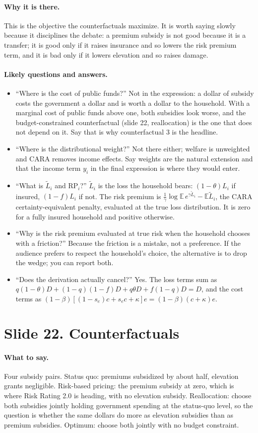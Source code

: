 \documentclass[11pt]{article}
\newcommand{\slide}[2]{\section*{Slide #1. #2}\addcontentsline{toc}{section}{Slide #1. #2}}
\newcommand{\say}{\paragraph{What to say.}}
\newcommand{\why}{\paragraph{Why it is there.}}
\newcommand{\qa}{\paragraph{Likely questions and answers.}}
\begin{document}
\why This is the objective the counterfactuals maximize. It is worth saying slowly because it disciplines the debate: a premium subsidy is not good because it is a transfer; it is good only if it raises insurance and so lowers the risk premium term, and it is bad only if it lowers elevation and so raises damage.

\qa
\begin{itemize}
\item ``Where is the cost of public funds?'' Not in the expression: a dollar of subsidy costs the government a dollar and is worth a dollar to the household. With a marginal cost of public funds above one, both subsidies look worse, and the budget-constrained counterfactual (slide 22, reallocation) is the one that does not depend on it. Say that is why counterfactual 3 is the headline.
\item ``Where is the distributional weight?'' Not there either; welfare is unweighted and CARA removes income effects. Say weights are the natural extension and that the income term $y_i$ in the final expression is where they would enter.
\item ``What is $\tilde L_i$ and $\mathrm{RP}_i$?'' $\tilde L_i$ is the loss the household bears: $(1-\theta)L_i$ if insured, $(1-f)L_i$ if not. The risk premium is $\frac{1}{\gamma}\log \mathbb{E}\, e^{\gamma \tilde L_i} - \mathbb{E}\tilde L_i$, the CARA certainty-equivalent penalty, evaluated at the true loss distribution. It is zero for a fully insured household and positive otherwise.
\item ``Why is the risk premium evaluated at true risk when the household chooses with a friction?'' Because the friction is a mistake, not a preference. If the audience prefers to respect the household's choice, the alternative is to drop the wedge; you can report both.
\item ``Does the derivation actually cancel?'' Yes. The loss terms sum as $q(1-\theta)D + (1-q)(1-f)D + q\theta D + f(1-q)D = D$, and the cost terms as $(1-\beta)[(1-s_e)c + s_e c + \kappa]e = (1-\beta)(c+\kappa)e$.
\end{itemize}

\slide{22}{Counterfactuals}
\say Four subsidy pairs. Status quo: premiums subsidized by about half, elevation grants negligible. Risk-based pricing: the premium subsidy at zero, which is where Risk Rating 2.0 is heading, with no elevation subsidy. Reallocation: choose both subsidies jointly holding government spending at the status-quo level, so the question is whether the same dollars do more as elevation subsidies than as premium subsidies. Optimum: choose both jointly with no budget constraint.
\end{document}
